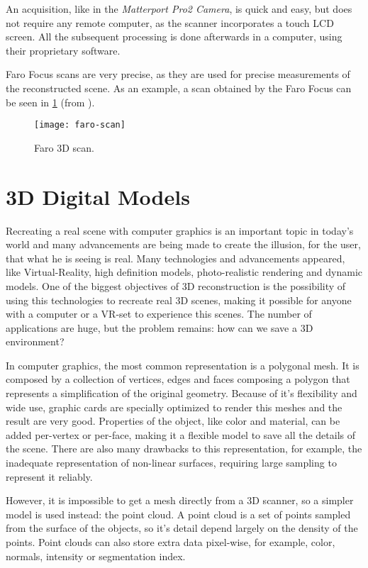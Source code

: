 An acquisition, like in the \emph{Matterport Pro2 Camera}, is quick and easy, but does not require any remote computer, as the scanner incorporates a touch LCD screen. All the subsequent processing is done afterwards in a computer, using their proprietary software.

Faro Focus scans are very precise, as they are used for precise measurements of the reconstructed scene. As an example, a scan obtained by the Faro Focus can be seen in \cref{fig:faro-scan} (from \cite{faro-scan}).

\begin{figure}[h]
    \centering
    \texttt{[image: faro-scan]}
    \caption{Faro 3D scan.}
    \label{fig:faro-scan}
    
\end{figure}

\section{3D Digital Models}

Recreating a real scene with computer graphics is an important topic in today's world and many advancements are being made to create the illusion, for the user, that what he is seeing is real. Many technologies and advancements appeared, like Virtual-Reality, high definition models, photo-realistic rendering and dynamic models. One of the biggest objectives of 3D reconstruction is the possibility of using this technologies to recreate real 3D scenes, making it possible for anyone with a computer or a VR-set to experience this scenes. The number of applications are huge, but the problem remains: how can we save a 3D environment?

In computer graphics, the most common representation is a polygonal mesh. It is composed by a collection of vertices, edges and faces composing a polygon that represents a simplification of the original geometry. Because of it's flexibility and wide use, graphic cards are specially optimized to render this meshes and the result are very good. Properties of the object, like color and material, can be added per-vertex or per-face, making it a flexible model to save all the details of the scene. There are also many drawbacks to this representation, for example, the inadequate representation of non-linear surfaces, requiring large sampling to represent it reliably.

However, it is impossible to get a mesh directly from a 3D scanner, so a simpler model is used instead: the point cloud. A point cloud is a set of points sampled from the surface of the objects, so it's detail depend largely on the density of the points. Point clouds can also store extra data pixel-wise, for example, color, normals, intensity or segmentation index.

